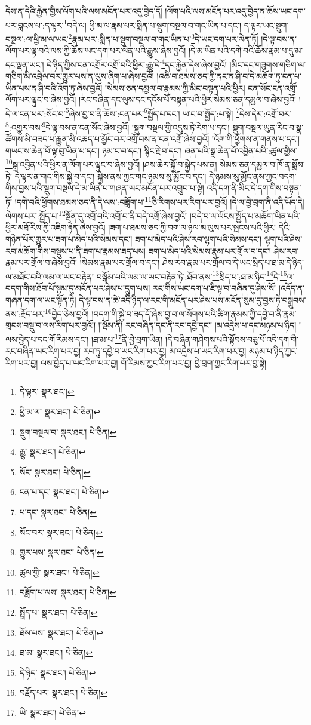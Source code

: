 དེས་ན་དེའི་རྐྱེན་གྱིས་ལོག་པའི་ལས་མངོན་པར་འདུ་བྱེད་དོ། །ལོག་པའི་ལས་མངོན་པར་འདུ་བྱེད་ན་ཆོས་ཡང་དག་པར་བླངས་པ་:ད་ལྟར་\footnote{དེ་ལྟར་  སྣར་ཐང་། }བདེ་ལ། ཕྱི་མ་ལ་རྣམ་པར་སྨིན་པ་སྡུག་བསྔལ་བ་གང་ཡིན་པ་དང་། ད་ལྟར་ཡང་སྡུག་བསྔལ་:ལ་ཕྱི་མ་ལ་ཡང་\footnote{ཕྱི་མ་ལ་  སྣར་ཐང་།  པེ་ཅིན། }རྣམ་པར་:སྨིན་པ་སྡུག་བསྔལ་བ་གང་ཡིན་པ་\footnote{སྡུག་བསྔལ་བ་  སྣར་ཐང་།  པེ་ཅིན། }དེ་ཡང་དག་པར་ལེན་ཏོ། །དེ་ལྟ་བས་ན་ལོག་པར་ལྟ་བའི་ལས་ཀྱི་ཆོས་ཡང་དག་པར་ལེན་པའི་རྒྱུས་ཞེས་བྱའོ། །དེ་མ་ཡིན་པའི་དགེ་བའི་ཆོས་རྣམ་པ་དུ་མ་དང་ལྡན་ཡང་། དེ་ཉིད་ཀྱིས་ངན་འགྲོར་འགྲོ་བའི་ཕྱིར་:རྒྱུ་དེ་\footnote{རྒྱུ་  སྣར་ཐང་།  པེ་ཅིན། }དང་རྐྱེན་དེས་ཞེས་བྱའོ། །མིང་དང་གཟུགས་གཅིག་ལ་གཅིག་མི་འབྲེལ་བར་གྱུར་པས་ན་ལུས་ཞིག་པ་ཞེས་བྱའོ། །འཆི་བ་ཐམས་ཅད་ཀྱི་ནང་ན་ཤི་བ་དེ་མཆོག་ཏུ་ངན་པ་ཡིན་པས་ན་ཤི་བའི་འོག་ཏུ་ཞེས་བྱའོ། །སེམས་ཅན་དམྱལ་བ་རྣམས་ཀྱི་མིང་བསྟན་པའི་ཕྱིར། ངན་སོང་ངན་འགྲོ་ལོག་པར་ལྟུང་བ་ཞེས་བྱའོ། །རང་བཞིན་དང་ལུས་དང་དངོས་པོ་བསྟན་པའི་ཕྱིར་སེམས་ཅན་དམྱལ་བ་ཞེས་བྱའོ། །དེ་ལ་ངན་པར་:སོང་བ་\footnote{སོང་  སྣར་ཐང་།  པེ་ཅིན། }ཞེས་བྱ་བ་ནི་ཆོས་:ངན་པར་\footnote{ངན་པ་དང་  སྣར་ཐང་།  པེ་ཅིན། }སྤྱོད་པ་དང་། ཡ་ང་བ་སྤྱོད་:པ་སྟེ། \footnote{པ་དང་  སྣར་ཐང་།  པེ་ཅིན། }དེས་དེར་:འགྲོ་བར་\footnote{སོང་བར་  སྣར་ཐང་།  པེ་ཅིན། }:འགྱུར་བས་\footnote{གྱུར་པས་  སྣར་ཐང་།  པེ་ཅིན། }དེ་ལྟ་བས་ན་ངན་སོང་ཞེས་བྱའོ། །སྡུག་བསྔལ་གྱི་འདུས་ཏེ་རེག་པ་དང་། སྡུག་བསྔལ་ཡུན་རིང་བ་སྣ་ཚོགས་མི་བཟད་པ་རྒྱུན་མི་འཆད་པ་མྱོང་བར་འགྲོ་བས་ན་ངན་འགྲོ་ཞེས་བྱའོ། །འོག་གི་ཕྱོགས་ན་གནས་པ་དང་། གཡང་ས་ཆེན་པོ་ལྟ་བུ་ཡིན་པ་དང་། ཉམ་ང་བ་དང་། སྙིང་རྗེ་བ་དང་། ཞན་པའི་སྒྲ་ཆེན་པོ་འབྱིན་པའི་:ཚུལ་གྱིས་\footnote{ཚུལ་གྱི་  སྣར་ཐང་།  པེ་ཅིན། }སྒྲ་འབྱིན་པའི་ཕྱིར་ན་ལོག་པར་ལྟུང་བ་ཞེས་བྱའོ། །ཤས་ཆེར་སྐྱོ་བ་སྐྱེད་པས་ན། སེམས་ཅན་དམྱལ་བ་ཁོ་ན་སྨོས་ཏེ། དེ་ལྟར་ན་གང་གིས་སྐྱེ་བ་དང་། སྐྱེས་ནས་ཀྱང་གང་ཉམས་སུ་མྱོང་བ་དང་། དེ་ཉམས་སུ་མྱོང་ནས་ཀྱང་བདག་གིས་བྱས་པའི་སྡུག་བསྔལ་དེ་མ་ཡིན་པ་གཞན་ཡང་མངོན་པར་འགྲུབ་པ་སྟེ། འདི་དག་ནི་མིང་དེ་དག་གིས་བསྟན་ཏོ། །དགེ་བའི་ཕྱོགས་ཐམས་ཅད་ནི་དེ་ལས་:བཟློག་པ་\footnote{བཟློག་པ་ལས་  སྣར་ཐང་།  པེ་ཅིན། }ཅི་རིགས་པར་རིག་པར་བྱའོ། །དེ་ལ་བྱེ་བྲག་ནི་འདི་ཡོད་དེ། ལེགས་པར་:སྤྱོད་པ་\footnote{སྤྲོད་པ་  སྣར་ཐང་།  པེ་ཅིན། }སྔོན་དུ་འགྲོ་བའི་འགྲོ་བ་ནི་བདེ་འགྲོ་ཞེས་བྱའོ། །བདེ་བ་ལ་ལོངས་སྤྱོད་པ་མཆོག་ཡིན་པའི་ཕྱིར་མཐོ་རིས་ཀྱི་འཇིག་རྟེན་ཞེས་བྱའོ། །ཟག་པ་ཐམས་ཅད་ཀྱི་བག་ལ་ཉལ་མ་ལུས་པར་སྤངས་པའི་ཕྱིར། དེའི་གཉེན་པོར་གྱུར་པ་ཟག་པ་མེད་པའི་སེམས་དང་། ཟག་པ་མེད་པའི་ཤེས་རབ་ལྷག་པའི་སེམས་དང་། ལྷག་པའི་ཤེས་རབ་མཆོག་གིས་བསྡུས་པ་ནི་ཟག་པ་རྣམས་ཟད་པས། ཟག་པ་མེད་པའི་སེམས་རྣམ་པར་གྲོལ་བ་དང་། ཤེས་རབ་རྣམ་པར་གྲོལ་བ་ཞེས་བྱའོ། །སེམས་རྣམ་པར་གྲོལ་བ་དང་། ཤེས་རབ་རྣམ་པར་གྲོལ་བ་དེ་ཡང་སྲིད་པ་ཐ་མ་དེ་ཉིད་ལ་མཐོང་བའི་ལམ་ལ་ཡང་བརྟེན། བསྒོམ་པའི་ལམ་ལ་ཡང་བརྟེན་ཏེ་:ཐོབ་ནས་\footnote{ཐོས་པས་  སྣར་ཐང་།  པེ་ཅིན། }སྲིད་པ་:ཐ་མ་ཉིད་\footnote{ཐ་མ་  སྣར་ཐང་།  པེ་ཅིན། }དེ་\footnote{དེ་ཉིད་  སྣར་ཐང་།  པེ་ཅིན། }ལ་བདག་གིས་ཐོབ་པོ་སྙམ་དུ་མངོན་པར་ཤེས་པ་དྲུག་པས། རང་གིས་ཡང་དག་པ་ཇི་ལྟ་བ་བཞིན་དུ་ཤེས་སོ། །འདོད་ན་གཞན་དག་ལ་ཡང་སྟོན་ཏེ། དེ་ལྟ་བས་ན་ཚེ་འདི་ཉིད་ལ་རང་གི་མངོན་པར་ཤེས་པས་མངོན་སུམ་དུ་བྱས་ཏེ་བསྒྲུབས་ནས་:རྗོད་པར་\footnote{བརྗོད་པར་  སྣར་ཐང་།  པེ་ཅིན། }བྱེད་ཅེས་བྱའོ། །བདག་གི་སྐྱེ་བ་ཟད་དོ་ཞེས་བྱ་བ་ལ་སོགས་པའི་ཚིག་རྣམས་ཀྱི་དབྱེ་བ་ནི་རྣམ་གྲངས་བསྡུ་བ་ལས་རིག་པར་བྱའོ།། །།སྡོམ་ནི། རང་བཞིན་དང་ནི་རབ་དབྱེ་དང་། །མ་འདྲེས་པ་དང་མཉམ་པ་ཉིད། །ལས་བྱེད་པ་དང་གོ་རིམས་དང་། །ཐ་མ་པ་\footnote{ཡི་  སྣར་ཐང་།  པེ་ཅིན། }ནི་བྱེ་བྲག་ཡིན། །དེ་བཞིན་གཤེགས་པའི་སྟོབས་བཅུ་པོ་འདི་དག་གི་རང་བཞིན་ཡང་རིག་པར་བྱ། རབ་ཏུ་དབྱེ་བ་ཡང་རིག་པར་བྱ། མ་འདྲེས་པ་ཡང་རིག་པར་བྱ། མཉམ་པ་ཉིད་ཀྱང་རིག་པར་བྱ། ལས་བྱེད་པ་ཡང་རིག་པར་བྱ། གོ་རིམས་ཀྱང་རིག་པར་བྱ། བྱེ་བྲག་ཀྱང་རིག་པར་བྱ་སྟེ། 